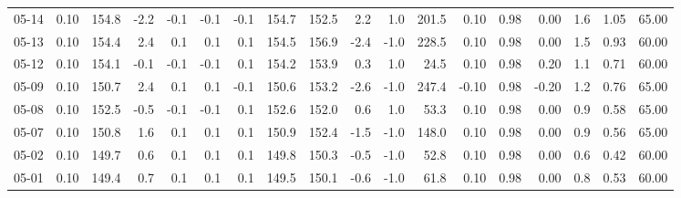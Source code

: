 \begin{threeparttable}
{\begin{tabular}{lrrrrrrrrrrrrrrrrr}
  05-14 &     0.10 & 154.8 &              -2.2 &              -0.1 &               -0.1 &               -0.1 & 154.7 & 152.5 &        2.2 &                      1.0 &               201.5 &       0.10 &      0.98 &           0.00 &              1.6 &            1.05 &                  65.00 \\
  05-13 &     0.10 & 154.4 &               2.4 &               0.1 &                0.1 &                0.1 & 154.5 & 156.9 &       -2.4 &                     -1.0 &               228.5 &       0.10 &      0.98 &           0.00 &              1.5 &            0.93 &                  60.00 \\
  05-12 &     0.10 & 154.1 &              -0.1 &              -0.1 &               -0.1 &                0.1 & 154.2 & 153.9 &        0.3 &                      1.0 &                24.5 &       0.10 &      0.98 &           0.20 &              1.1 &            0.71 &                  60.00 \\
  05-09 &     0.10 & 150.7 &               2.4 &               0.1 &                0.1 &               -0.1 & 150.6 & 153.2 &       -2.6 &                     -1.0 &               247.4 &      -0.10 &      0.98 &          -0.20 &              1.2 &            0.76 &                  65.00 \\
  05-08 &     0.10 & 152.5 &              -0.5 &              -0.1 &               -0.1 &                0.1 & 152.6 & 152.0 &        0.6 &                      1.0 &                53.3 &       0.10 &      0.98 &           0.00 &              0.9 &            0.58 &                  65.00 \\
  05-07 &     0.10 & 150.8 &               1.6 &               0.1 &                0.1 &                0.1 & 150.9 & 152.4 &       -1.5 &                     -1.0 &               148.0 &       0.10 &      0.98 &           0.00 &              0.9 &            0.56 &                  65.00 \\
  05-02 &     0.10 & 149.7 &               0.6 &               0.1 &                0.1 &                0.1 & 149.8 & 150.3 &       -0.5 &                     -1.0 &                52.8 &       0.10 &      0.98 &           0.00 &              0.6 &            0.42 &                  60.00 \\
  05-01 &     0.10 & 149.4 &               0.7 &               0.1 &                0.1 &                0.1 & 149.5 & 150.1 &       -0.6 &                     -1.0 &                61.8 &       0.10 &      0.98 &           0.00 &              0.8 &            0.53 &                  60.00 \\

\end{tabular}}
\end{threeparttable}
